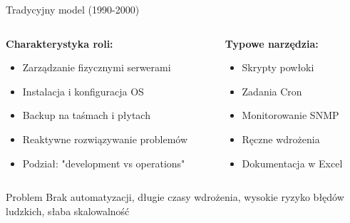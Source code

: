 \documentclass[10pt, aspectratio=169]{beamer}
\begin{document}
\begin{frame}{Tradycyjny model (1990-2000)}
\begin{columns}[T]
\begin{column}{0.5\textwidth}
\textbf{Charakterystyka roli:}
\begin{itemize}
\item Zarządzanie fizycznymi serwerami
\item Instalacja i konfiguracja OS
\item Backup na taśmach i płytach
\item Reaktywne rozwiązywanie problemów
\item Podział: "development vs operations"
\end{itemize}
\end{column}
\begin{column}{0.5\textwidth}
\textbf{Typowe narzędzia:}
\begin{itemize}
\item Skrypty powłoki
\item Zadania Cron
\item Monitorowanie SNMP
\item Ręczne wdrożenia
\item Dokumentacja w Excel
\end{itemize}
\end{column}
\end{columns}

\begin{alertblock}{Problem}
Brak automatyzacji, długie czasy wdrożenia, wysokie ryzyko błędów ludzkich, słaba skalowalność
\end{alertblock}
\end{frame}
\end{document}
